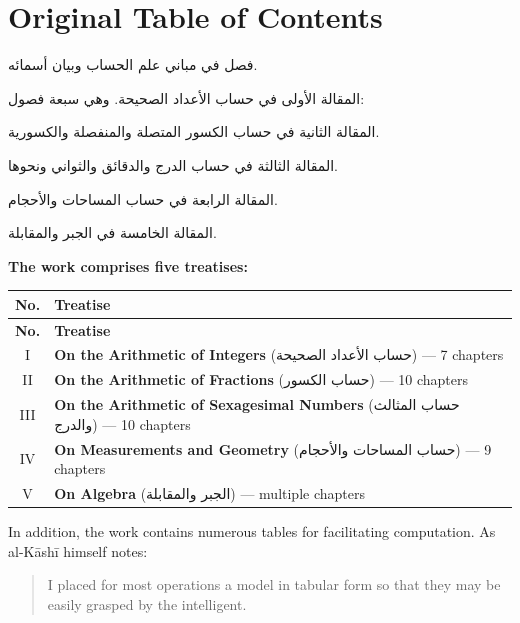 \documentclass[11pt,a4paper]{article}
\newenvironment{arabicbox}{%
  \begin{framed}
  \begin{minipage}{\linewidth-2\fboxsep-2\fboxrule}
  \setlength{\parindent}{0pt}
  \linespread{1.3}\selectfont
}{%
  \end{minipage}
  \end{framed}
}
\newcommand{\ar}[1]{{\arabicfont\beginR #1\endR}}
\begin{document}
\section*{Original Table of Contents}

\begin{arabicbox}
\begin{Arabic}
فصل في مباني علم الحساب وبيان أسمائه.

المقالة الأولى في حساب الأعداد الصحيحة. وهي سبعة فصول:

المقالة الثانية في حساب الكسور المتصلة والمنفصلة والكسورية.

المقالة الثالثة في حساب الدرج والدقائق والثواني ونحوها.

المقالة الرابعة في حساب المساحات والأحجام.

المقالة الخامسة في الجبر والمقابلة.
\end{Arabic}
\end{arabicbox}

\vspace{0.5cm}

\noindent\textbf{The work comprises five treatises:}

\begin{longtable}{|c|p{10cm}|}
\hline
\textbf{No.} & \textbf{Treatise} \\
\hline
\endfirsthead
\hline
\textbf{No.} & \textbf{Treatise} \\
\hline
\endhead
I & \textbf{On the Arithmetic of Integers} (\ar{حساب الأعداد الصحيحة}) --- 7 chapters \\
\hline
II & \textbf{On the Arithmetic of Fractions} (\ar{حساب الكسور}) --- 10 chapters \\
\hline
III & \textbf{On the Arithmetic of Sexagesimal Numbers} (\ar{حساب المثالث والدرج}) --- 10 chapters \\
\hline
IV & \textbf{On Measurements and Geometry} (\ar{حساب المساحات والأحجام}) --- 9 chapters \\
\hline
V & \textbf{On Algebra} (\ar{الجبر والمقابلة}) --- multiple chapters \\
\hline
\end{longtable}

\noindent In addition, the work contains numerous tables for facilitating
computation. As al-K\=ash\=i himself notes:
\begin{quote}
I placed for most operations a model in tabular form so that they may be
easily grasped by the intelligent.
\end{quote}
\clearpage
\end{document}
